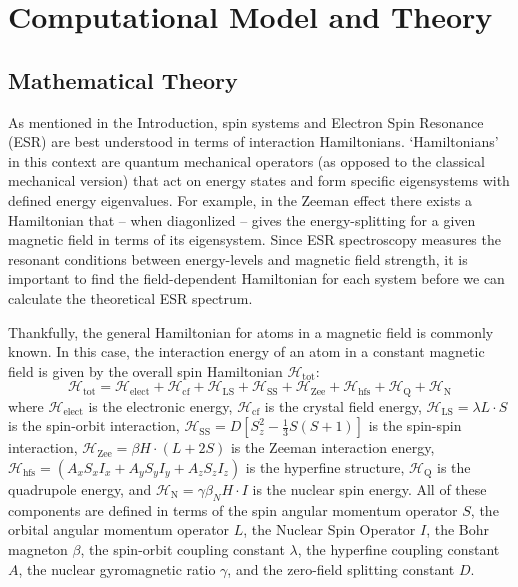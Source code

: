 \documentclass[oneside, astronomy, noacknowlegments]{BYUPhys}
\begin{document}
\chapter{Computational Model and Theory}

\section{Mathematical Theory}

As mentioned in the Introduction, spin systems and Electron Spin Resonance (ESR) are best understood in terms of interaction Hamiltonians. `Hamiltonians' in this context are quantum mechanical operators (as opposed to the classical mechanical version) that act on energy states and form specific eigensystems with defined energy eigenvalues. For example, in the Zeeman effect there exists a Hamiltonian that -- when diagonlized -- gives the energy-splitting for a given magnetic field in terms of its eigensystem. Since ESR spectroscopy measures the resonant conditions between energy-levels and magnetic field strength, it is important to find the field-dependent Hamiltonian for each system before we can calculate the theoretical ESR spectrum.

Thankfully, the general Hamiltonian for atoms in a magnetic field is commonly known. In this case, the interaction energy of an atom in a constant magnetic field is given by the overall spin Hamiltonian $\mathcal{H}_{\text{tot}}$: $$\mathcal{H}_{\text{tot}} = \mathcal{H}_{\text{elect}} + \mathcal{H}_{\text{cf}} + \mathcal{H}_{\text{LS}} + \mathcal{H}_{\text{SS}} + \mathcal{H}_{\text{Zee}} + \mathcal{H}_{\text{hfs}} + \mathcal{H}_{\text{Q}} + \mathcal{H}_{\text{N}}$$ where $\mathcal{H}_{\text{elect}}$ is the electronic energy, $\mathcal{H}_{\text{cf}}$ is the crystal field energy, $\mathcal{H}_{\text{LS}} = \lambda L \cdot S$ is the spin-orbit interaction, $\mathcal{H}_{\text{SS}} = D \left[ S_{z}^{2} - \frac{1}{3} S (S+1) \right]$ is the spin-spin interaction, $\mathcal{H}_{\text{Zee}} = \beta H \cdot (L+2S)$ is the Zeeman interaction energy, $\mathcal{H}_{\text{hfs}} = \left(A_xS_xI_x + A_yS_yI_y + A_zS_zI_z\right)$ is the hyperfine structure, $\mathcal{H}_{\text{Q}}$ is the quadrupole energy, and $\mathcal{H}_{\text{N}} = \gamma \beta_{N} H \cdot I$ is the nuclear spin energy. All of these components are defined in terms of the spin angular momentum operator $S$, the orbital angular momentum operator $L$, the Nuclear Spin Operator $I$, the Bohr magneton $\beta$, the spin-orbit coupling constant $\lambda$, the hyperfine coupling constant $A$, the nuclear gyromagnetic ratio $\gamma$, and the zero-field splitting constant $D$.
\end{document}
